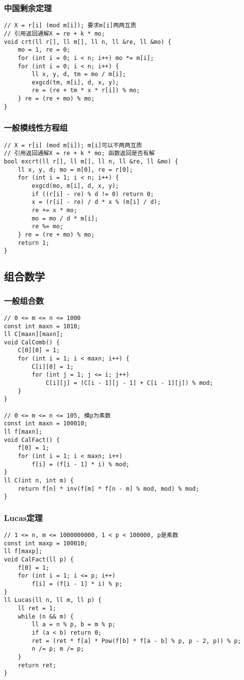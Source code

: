 \documentclass[a4]{article}
\begin{document}
\subsubsection{中国剩余定理}
\begin{lstlisting}
// X = r[i] (mod m[i]); 要求m[i]两两互质
// 引用返回通解X = re + k * mo;
void crt(ll r[], ll m[], ll n, ll &re, ll &mo) {
	mo = 1, re = 0;
	for (int i = 0; i < n; i++) mo *= m[i];
	for (int i = 0; i < n; i++) {
		ll x, y, d, tm = mo / m[i];
		exgcd(tm, m[i], d, x, y);
		re = (re + tm * x * r[i]) % mo;
	} re = (re + mo) % mo;
}
\end{lstlisting}
\subsubsection{一般模线性方程组}
\begin{lstlisting}
// X = r[i] (mod m[i]); m[i]可以不两两互质
// 引用返回通解X = re + k * mo; 函数返回是否有解
bool excrt(ll r[], ll m[], ll n, ll &re, ll &mo) {
	ll x, y, d; mo = m[0], re = r[0];
	for (int i = 1; i < n; i++) {
		exgcd(mo, m[i], d, x, y);
		if ((r[i] - re) % d != 0) return 0;
		x = (r[i] - re) / d * x % (m[i] / d);
		re += x * mo;
		mo = mo / d * m[i];
		re %= mo;
	} re = (re + mo) % mo;
	return 1;
}
\end{lstlisting}
\subsection{组合数学}
\subsubsection{一般组合数}
\begin{lstlisting}
// 0 <= m <= n <= 1000
const int maxn = 1010;
ll C[maxn][maxn];
void CalComb() {
	C[0][0] = 1;
	for (int i = 1; i < maxn; i++) {
		C[i][0] = 1;
		for (int j = 1; j <= i; j++)
			C[i][j] = (C[i - 1][j - 1] + C[i - 1][j]) % mod;
	}
}

// 0 <= m <= n <= 105, 模p为素数
const int maxn = 100010;
ll f[maxn];
void CalFact() {
	f[0] = 1;
	for (int i = 1; i < maxn; i++)
		f[i] = (f[i - 1] * i) % mod;
}
ll C(int n, int m) {
	return f[n] * inv(f[m] * f[n - m] % mod, mod) % mod;
}
\end{lstlisting}
\subsubsection{Lucas定理}
\begin{lstlisting}
// 1 <= n, m <= 1000000000, 1 < p < 100000, p是素数
const int maxp = 100010;
ll f[maxp];
void CalFact(ll p) {
	f[0] = 1;
	for (int i = 1; i <= p; i++)
		f[i] = (f[i - 1] * i) % p;
}
ll Lucas(ll n, ll m, ll p) {
	ll ret = 1;
	while (n && m) {
		ll a = n % p, b = m % p;
		if (a < b) return 0;
		ret = (ret * f[a] * Pow(f[b] * f[a - b] % p, p - 2, p)) % p;
		n /= p; m /= p;
	}
	return ret;
}
\end{lstlisting}
\end{document}

